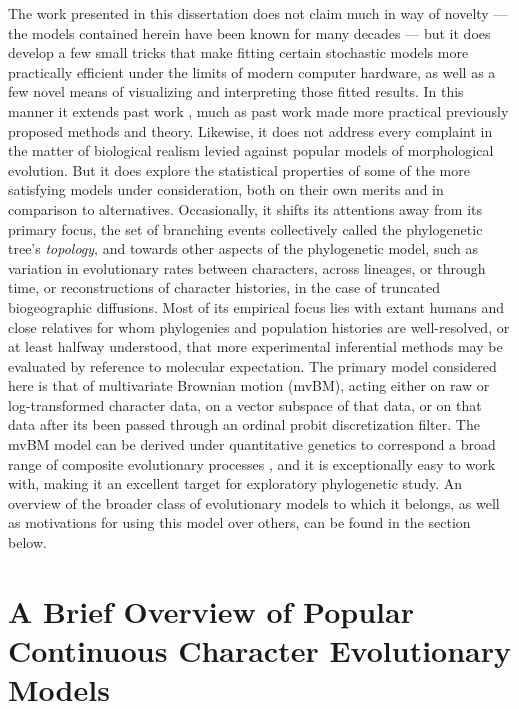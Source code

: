 The work presented in this dissertation does not claim much in way of novelty --- the models contained herein have been known for many decades --- but it does develop a few small tricks that make fitting certain stochastic models more practically efficient under the limits of modern computer hardware, as well as a few novel means of visualizing and interpreting those fitted results. In this manner it extends past work \citep[as e.g.][before it]{felsensteinMaximumlikelihoodEstimationEvolutionary1973, felsensteinUsingQuantitativeGenetic2005}, much as past work made more practical previously proposed methods and theory. Likewise, it does not address every complaint in the matter of biological realism levied against popular models of morphological evolution. But it does explore the statistical properties of some of the more satisfying models under consideration, both on their own merits and in comparison to alternatives. Occasionally, it shifts its attentions away from its primary focus, the set of branching events collectively called the phylogenetic tree's \textit{topology}, and towards other aspects of the phylogenetic model, such as variation in evolutionary rates between characters, across lineages, or through time, or reconstructions of character histories, in the case of truncated biogeographic diffusions. Most of its empirical focus lies with extant humans and close relatives for whom phylogenies and population histories are well-resolved, or at least halfway understood, that more experimental inferential methods may be evaluated by reference to molecular expectation. The primary model considered here is that of multivariate Brownian motion (mvBM), acting either on raw or log-transformed character data, on a vector subspace of that data, or on that data after its been passed through an ordinal probit discretization filter. The mvBM model can be derived under quantitative genetics to correspond a broad range of composite evolutionary processes \citep{hansenTranslatingMicroevolutionaryProcess1996}, and it is exceptionally easy to work with, making it an excellent target for exploratory phylogenetic study. An overview of the broader class of evolutionary models to which it belongs, as well as motivations for using this model over others, can be found in the section below.

\clearpage

\section{A Brief Overview of Popular Continuous Character Evolutionary Models}

